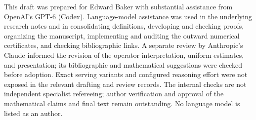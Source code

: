 \documentclass[11pt]{article}
\numberwithin{equation}{section}
\theoremstyle{definition}
\theoremstyle{remark}
\begin{document}
This draft was prepared for Edward Baker with substantial assistance
from OpenAI's GPT-6 (Codex). Language-model assistance was used in
the underlying research notes and in consolidating definitions,
developing and checking proofs, organizing the manuscript,
implementing and auditing the outward numerical certificates, and
checking bibliographic links. A separate review by Anthropic's Claude
informed the revision of the operator interpretation, uniform estimates,
and presentation; its bibliographic and mathematical suggestions were
checked before adoption. Exact serving variants and configured reasoning
effort were not exposed in the relevant drafting and review records.
The internal checks are not independent specialist
refereeing; author verification and approval of the mathematical
claims and final text remain outstanding. No language model is
listed as an author.
\end{document}
